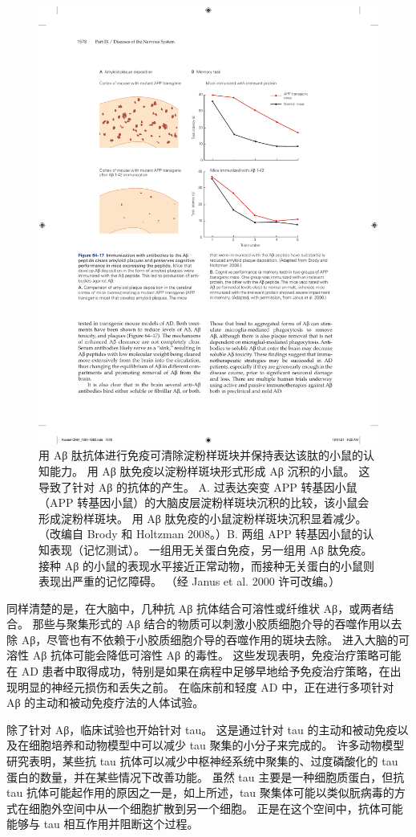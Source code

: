 \begin{figure}[htbp]
	\centering
	\includegraphics[width=0.8\linewidth]{chap64/fig_64_17}
	\caption{用 Aβ 肽抗体进行免疫可清除淀粉样斑块并保持表达该肽的小鼠的认知能力。 用 Aβ 肽免疫以淀粉样斑块形式形成 Aβ 沉积的小鼠。 这导致了针对 Aβ 的抗体的产生。 A. 过表达突变 APP 转基因小鼠（APP 转基因小鼠）的大脑皮层淀粉样斑块沉积的比较，该小鼠会形成淀粉样斑块。 用 Aβ 肽免疫的小鼠淀粉样斑块沉积显着减少。 （改编自 Brody 和 Holtzman 2008。）B. 两组 APP 转基因小鼠的认知表现（记忆测试）。 一组用无关蛋白免疫，另一组用 Aβ 肽免疫。 接种 Aβ 的小鼠的表现水平接近正常动物，而接种无关蛋白的小鼠则表现出严重的记忆障碍。 （经 Janus et al. 2000 许可改编。）}
	\label{fig:64_17}
\end{figure}

同样清楚的是，在大脑中，几种抗 Aβ 抗体结合可溶性或纤维状 Aβ，或两者结合。 那些与聚集形式的 Aβ 结合的物质可以刺激小胶质细胞介导的吞噬作用以去除 Aβ，尽管也有不依赖于小胶质细胞介导的吞噬作用的斑块去除。 进入大脑的可溶性 Aβ 抗体可能会降低可溶性 Aβ 的毒性。 这些发现表明，免疫治疗策略可能在 AD 患者中取得成功，特别是如果在病程中足够早地给予免疫治疗策略，在出现明显的神经元损伤和丢失之前。 在临床前和轻度 AD 中，正在进行多项针对 Aβ 的主动和被动免疫疗法的人体试验。

除了针对 Aβ，临床试验也开始针对 tau。 这是通过针对 tau 的主动和被动免疫以及在细胞培养和动物模型中可以减少 tau 聚集的小分子来完成的。 许多动物模型研究表明，某些抗 tau 抗体可以减少中枢神经系统中聚集的、过度磷酸化的 tau 蛋白的数量，并在某些情况下改善功能。 虽然 tau 主要是一种细胞质蛋白，但抗 tau 抗体可能起作用的原因之一是，如上所述，tau 聚集体可能以类似朊病毒的方式在细胞外空间中从一个细胞扩散到另一个细胞。 正是在这个空间中，抗体可能能够与 tau 相互作用并阻断这个过程。

